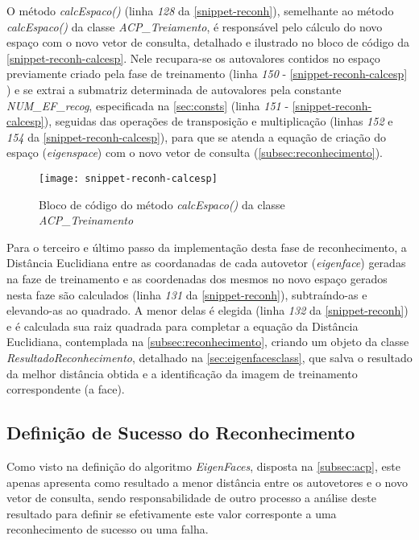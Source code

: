 O método \textit{calcEspaco()} (linha \textit{128} da \autoref{snippet-reconh}), semelhante ao método \textit{calcEspaco()} da classe \textit{ACP\_Treiamento}, é responsável pelo cálculo do novo espaço com o novo vetor de consulta, detalhado e ilustrado no bloco de código da \autoref{snippet-reconh-calcesp}. Nele recupara-se os autovalores contidos no espaço previamente criado pela fase de treinamento (linha \textit{150} - \autoref{snippet-reconh-calcesp} ) e se extrai a submatriz determinada de autovalores pela constante \textit{NUM\_EF\_recog}, especificada na \autoref{sec:consts} (linha \textit{151} - \autoref{snippet-reconh-calcesp}), seguidas das operações de transposição e multiplicação (linhas \textit{152} e \textit{154} da \autoref{snippet-reconh-calcesp}), para que se atenda a equação de criação do espaço (\textit{eigenspace}) com o novo vetor de consulta (\autoref{subsec:reconhecimento}).

\begin{figure}[h]
	\centering
	\texttt{[image: snippet-reconh-calcesp]}
	\caption{Bloco de código do método \textit{calcEspaco()} da classe \textit{ACP\_Treinamento}}
	\label{snippet-reconh-calcesp}
\end{figure}


Para o terceiro e último passo da implementação desta fase de reconhecimento, a Distância Euclidiana entre as coordanadas de cada autovetor (\textit{eigenface}) geradas na faze de treinamento e as coordenadas dos mesmos no novo espaço gerados nesta faze são calculados (linha \textit{131} da \autoref{snippet-reconh}), subtraíndo-as e elevando-as ao quadrado. A menor delas é elegida (linha \textit{132} da \autoref{snippet-reconh}) e é calculada sua raiz quadrada para completar a equação da Distância Euclidiana, contemplada na \autoref{subsec:reconhecimento}, criando um objeto da classe \textit{ResultadoReconhecimento}, detalhado na \autoref{sec:eigenfacesclass}, que salva o resultado da melhor distância obtida e a identificação da imagem de treinamento correspondente (a face).


\subsection{Definição de Sucesso do Reconhecimento}\label{sec:defsucregoc}

Como visto na definição do algoritmo \textit{EigenFaces}, disposta na \autoref{subsec:acp}, este apenas apresenta como resultado a menor distância entre os autovetores e o novo vetor de consulta, sendo responsabilidade de outro processo a análise deste resultado para definir se efetivamente este valor corresponte a uma reconhecimento de sucesso ou uma falha.

